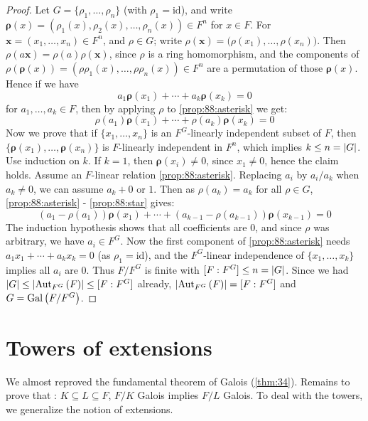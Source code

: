 \begin{proof}
  Let $G = \{ \rho_1, \dotsc, \rho_n\}$ (with $\rho_1 = \text{id}$), and write $\bm{\rho}(x) = \left( \rho_1(x), \rho_2(x), \dotsc, \rho_n(x) \right) \in F^n$ for $x \in F$. For $\bm{x} = (x_1, \dotsc, x_n) \in F^n$, and $\rho \in G$; write $\rho(\bm{x}) = \big( \rho(x_1), \dotsc, \rho(x_n) \big)$. Then $\rho(a\bm{x}) = \rho(a)\rho(\bm{x})$, since $\rho$ is a ring homomorphism, and the components of $\rho(\bm{\rho}(x)) = (\rho\rho_1(x), \dotsc, \rho\rho_n(x)) \in F^n$ are a permutation of those $\bm{\rho}(x)$. Hence if we have 
 \[
 a_1\bm{\rho}(x_1) + \dotsb + a_k\bm{\rho}(x_k) = 0 \tag{$\ast$} \label{prop:88:asterisk}
 \]
 for $a_1, \dotsc, a_k \in F$, then by applying $\rho$ to \eqref{prop:88:asterisk} we get:
 \[
 \rho(a_1)\bm{\rho}(x_1) + \dotsb + \rho(a_k)\bm{\rho}(x_k) = 0 \tag{$\star$} \label{prop:88:star}
 \]
Now we prove that if $\{x_1, \dotsc, x_n\}$ is an $F^G$-linearly independent subset of $F$, then $\{ \bm{\rho}(x_1), \dotsc, \bm{\rho}(x_n) \}$ is $F$-linearly independent in $F^n$, which implies $k \leq n  = \card{G}$. Use induction on $k$. If $k = 1$, then $\bm{\rho}(x_i) \neq 0$, since $x_1 \neq 0$, hence the claim holds. Assume an $F$-linear relation \eqref{prop:88:asterisk}. Replacing $a_i$ by $a_i/a_k$ when $a_k \neq 0$, we can assume $a_k + 0$ or $1$. Then as $\rho(a_k) = a_k$ for all $\rho \in G$, \eqref{prop:88:asterisk} - \eqref{prop:88:star} gives:
\[
(a_1 - \rho(a_1))\bm{\rho}(x_1) + \dotsb + (a_{k-1} - \rho(a_{k-1}))\bm{\rho}(x_{k-1}) = 0
\]
The induction hypothesis shows that all coefficients are 0, and since $\rho$ was arbitrary, we have $a_i \in F^G$. Now the first component of \eqref{prop:88:asterisk} needs $a_1x_1 + \dotsb + a_kx_k = 0$ (as $\rho_1 = \text{id}$), and the $F^G$-linear independence of $\{ x_1, \dotsc, x_k \}$ implies all $a_i$ are 0. Thus $F/F^G$ is finite with $[F : F^G] \leq n = \card{G}$. Since we had $\card{G} \leq \card{\autset[F^G]{F}} \leq [F : F^G]$ already, $\card{\autset[F^G]{F}} = [F : F^G]$ and $G = \Gal{F/F^G}$.
\end{proof}

\section{Towers of extensions}
\label{sec:3.2}

We almost reproved the fundamental theorem of Galois (\autoref{thm:34}). Remains to prove that : $K \subseteq L \subseteq F$, $F/K$ Galois implies $F/L$ Galois. To deal with the towers, we generalize the notion of extensions.

